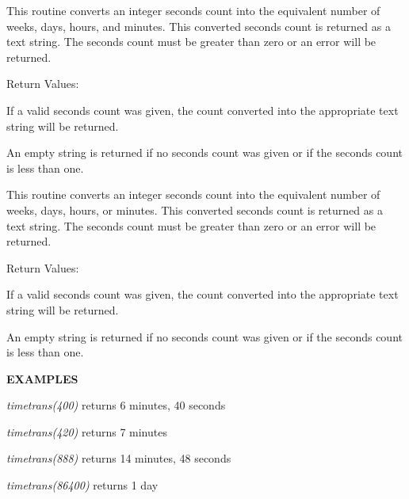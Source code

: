 \begin{description}

\item {}

This routine converts an integer seconds count into the equivalent number of
weeks, days, hours, and minutes.  This converted seconds count is returned
as a text string.  The seconds count must be greater than zero or an error
will be returned.

Return Values:

\begin{description}

\item If a valid seconds count was given, the count converted into the
appropriate text string will be returned.

\item An empty string is returned if no seconds count was given or if
the seconds count is less than one.

\end{description}

\item {}

This routine converts an integer seconds count into the equivalent number of
weeks, days, hours, or minutes.  This converted seconds count is returned
as a text string.  The seconds count must be greater than zero or an error
will be returned.

Return Values:

\begin{description}

\item If a valid seconds count was given, the count converted into the
appropriate text string will be returned.

\item An empty string is returned if no seconds count was given or if
the seconds count is less than one.

\end{description}

\end{description}

{\bf EXAMPLES}

{\it timetrans(400)} returns 6 minutes, 40 seconds

{\it timetrans(420)} returns 7 minutes

{\it timetrans(888)} returns 14 minutes, 48 seconds

{\it timetrans(86400)} returns 1 day

